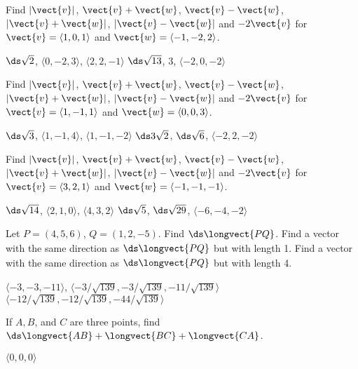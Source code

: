 \begin{enumialphparenastyle}
\begin{ex}
Find $|\vect{v}|$, $\vect{v}+\vect{w}$, $\vect{v}-\vect{w}$,
$|\vect{v}+\vect{w}|$, $|\vect{v}-\vect{w}|$ and $-2\vect{v}$ for
$\vect{v} = \langle 1,0,1\rangle$ and $\vect{w} = \langle -1,-2,2 \rangle$.
\begin{sol}
$\ds \sqrt{2}$, $\langle 0,-2,3\rangle$, $\langle 2,2,-1\rangle$
$\ds \sqrt{13}$, $3$, $\langle -2, 0, -2\rangle$
\end{sol}
\end{ex}

\begin{ex}
Find $|\vect{v}|$, $\vect{v}+\vect{w}$, $\vect{v}-\vect{w}$,
$|\vect{v}+\vect{w}|$, $|\vect{v}-\vect{w}|$ and $-2\vect{v}$ for
$\vect{v} = \langle 1,-1,1\rangle$ and $\vect{w} = \langle 0,0,3\rangle$.
\begin{sol}
$\ds \sqrt{3}$, $\langle 1,-1,4\rangle$, $\langle 1,-1,-2\rangle$
$\ds 3\sqrt{2}$, $\ds \sqrt{6}$, $\langle -2, 2, -2\rangle$
\end{sol}
\end{ex}

\begin{ex}
Find $|\vect{v}|$, $\vect{v}+\vect{w}$, $\vect{v}-\vect{w}$,
$|\vect{v}+\vect{w}|$, $|\vect{v}-\vect{w}|$ and $-2\vect{v}$ for
$\vect{v} = \langle 3,2,1\rangle$ and $\vect{w} = \langle -1,-1,-1\rangle$.
\begin{sol}
$\ds \sqrt{14}$, $\langle 2,1,0\rangle$, $\langle 4,3,2\rangle$
$\ds \sqrt{5}$, $\ds \sqrt{29}$, $\langle -6,-4, -2\rangle$
\end{sol}
\end{ex}

\begin{ex}
Let $P=(4,5,6)$, $Q=(1,2,-5)$. Find 
$\ds \longvect{\strut PQ}$. Find a vector with
the same direction as $\ds \longvect{\strut PQ}$
but with length 1. Find a vector with
the same direction as $\ds \longvect{\strut PQ}$
but with length 4.
\begin{sol}
$\langle -3, -3, -11\rangle$,
$\langle -3/\sqrt{139},-3/\sqrt{139},-11/\sqrt{139}\rangle$
$\langle -12/\sqrt{139},-12/\sqrt{139},-44/\sqrt{139}\rangle$
\end{sol}
\end{ex}

\begin{ex}
If $A, B$, and $C$ are three points, find
$\ds \longvect{\strut AB}+
\longvect{\strut BC}+
\longvect{\strut CA}$.
\begin{sol}
$\langle 0,0,0\rangle$
\end{sol}
\end{ex}


\end{enumialphparenastyle}
